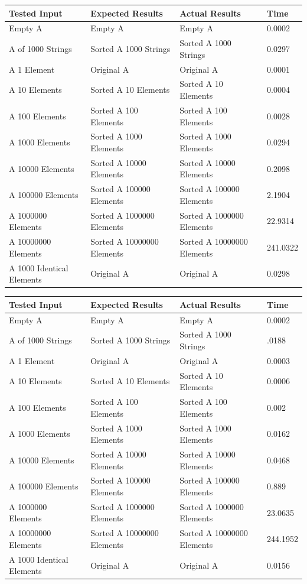 \documentclass[onecolumn, 12pt, article]{IEEEtran}
\numberwithin{case}{problem}
\numberwithin{condition}{problem}
\numberwithin{condition}{subsection}
\numberwithin{definition}{section}
\theoremstyle{remark}
\numberwithin{question}{problem}
\theoremstyle{plain}
\numberwithin{answer}{problem}
\numberwithin{solution}{section}
\numberwithin{equation}{section}%
\begin{document}
\begin{center}
\begin{tabular}{|l|l|l|l|}
\hline Tested Input & Expected Results & Actual Results & Time \\
\hline Empty A & Empty A & Empty A & 0.0002 \\
\hline A of 1000 Strings & Sorted A 1000 Strings & Sorted A 1000 Strings & 0.0297 \\
\hline A 1 Element & Original A & Original A & 0.0001 \\
\hline A 10 Elements & Sorted A 10 Elements & Sorted A 10 Elements & 0.0004 \\
\hline A 100 Elements & Sorted A 100 Elements & Sorted A 100 Elements & 0.0028 \\
\hline A 1000 Elements & Sorted A 1000 Elements & Sorted A 1000 Elements & 0.0294 \\
\hline A 10000 Elements & Sorted A 10000 Elements & Sorted A 10000 Elements & 0.2098 \\
\hline A 100000 Elements & Sorted A 100000 Elements & Sorted A 100000 Elements & 2.1904 \\
\hline A 1000000 Elements & Sorted A 1000000 Elements & Sorted A 1000000 Elements & 22.9314 \\
\hline A 10000000 Elements & Sorted A 10000000 Elements & Sorted A 10000000 Elements & 241.0322 \\
\hline A 1000 Identical Elements & Original A & Original A & 0.0298 \\
\hline
\end{tabular}
\end{center}
\begin{center}
\begin{tabular}{|l|l|l|l|}
\hline Tested Input & Expected Results & Actual Results & Time \\
\hline Empty A & Empty A & Empty A & 0.0002 \\
\hline A of 1000 Strings & Sorted A 1000 Strings & Sorted A 1000 Strings & .0188 \\
\hline A 1 Element & Original A & Original A & 0.0003 \\
\hline A 10 Elements & Sorted A 10 Elements & Sorted A 10 Elements & 0.0006 \\
\hline A 100 Elements & Sorted A 100 Elements & Sorted A 100 Elements & 0.002 \\
\hline A 1000 Elements & Sorted A 1000 Elements & Sorted A 1000 Elements & 0.0162 \\
\hline A 10000 Elements & Sorted A 10000 Elements & Sorted A 10000 Elements & 0.0468 \\
\hline A 100000 Elements & Sorted A 100000 Elements & Sorted A 100000 Elements & 0.889 \\
\hline A 1000000 Elements & Sorted A 1000000 Elements & Sorted A 1000000 Elements & 23.0635 \\
\hline A 10000000 Elements & Sorted A 10000000 Elements & Sorted A 10000000 Elements & 244.1952 \\
\hline A 1000 Identical Elements & Original A & Original A & 0.0156 \\
\hline
\end{tabular}
\end{center}
\end{document}
